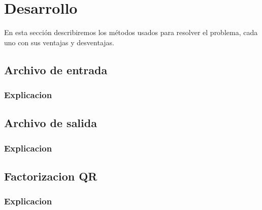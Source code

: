 \section{Desarrollo}
En esta sección describiremos los métodos usados para resolver el problema, cada uno con sus
ventajas y desventajas.

\subsection{Archivo de entrada}
\subsubsection{Explicacion}

\subsection{Archivo de salida}
\subsubsection{Explicacion}


\subsection{Factorizacion QR}
\subsubsection{Explicacion}




